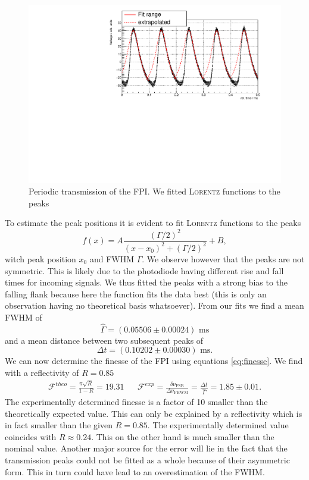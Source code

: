 \documentclass[11pt,a4paper,notitlepage]{scrartcl}
\begin{document}
\begin{figure}[htbp]
	\centering
	\includegraphics[width=\linewidth]{figs/measurements/fpi.pdf}
	\caption{Periodic transmission of the FPI. We fitted \textsc{Lorentz} functions to the peaks}
	\label{fig:fpi}
\end{figure}

To estimate the peak positions it is evident to fit \textsc{Lorentz} functions to the peaks $$f(x)=A\frac{(\Gamma/2)^2}{(x-x_0)^2+(\Gamma/2)^2}+B,$$
witch peak position $x_0$ and FWHM $\Gamma$.
We observe however that the peaks are not symmetric. This is likely due to the photodiode having different rise and fall times for incoming signals. We thus fitted the peaks with a strong bias to the falling flank because here the function fits the data best (this is only an observation having no theoretical basis whatsoever). From our fits we find a mean FWHM of $$\hat{\Gamma}=(0.05506\pm0.00024)\text{ ms}$$
and a mean distance between two subsequent peaks of $$\Delta t=(0.10202\pm0.00030)\text{ ms}.$$ 
We can now determine the finesse of the FPI using equations \cref{eq:finesse}. We find with a reflectivity of $R=0.85$ \cite{manual}
\begin{align*}
	\mathcal{F}^{theo}=\frac{\pi\sqrt{R}}{1-R}=19.31 && \mathcal{F}^{exp}=\frac{\delta\nu_{\text{FSR}}}{\Delta\nu_\text{FHWM}}=\frac{\Delta t}{\hat{\Gamma}}=1.85\pm0.01. 
\end{align*}
The experimentally determined finesse is a factor of 10 smaller than the theoretically expected value. This can only be explained by a reflectivity which is in fact smaller than the given $R=0.85$. The experimentally determined value coincides with $R\approx0.24$. This on the other hand is much smaller than the nominal value. Another major source for the error will lie in the fact that the transmission peaks could not be fitted as a whole because of their asymmetric form. This in turn could have lead to an overestimation of the FWHM.
\end{document}
